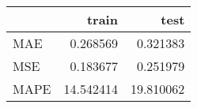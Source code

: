 \begin{tabular}{lrr}
\toprule
{} &      train &       test \\
\midrule
MAE  &   0.268569 &   0.321383 \\
MSE  &   0.183677 &   0.251979 \\
MAPE &  14.542414 &  19.810062 \\
\bottomrule
\end{tabular}
